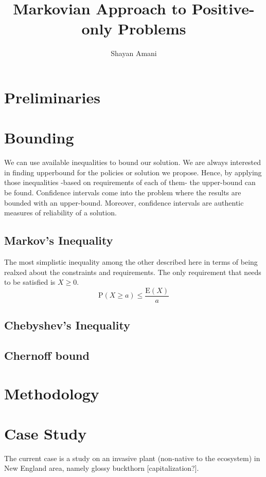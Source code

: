 \documentclass[a4paper,12pt]{article}
\title{Markovian Approach to Positive-only Problems}
\author{Shayan Amani}
\begin{document}
\maketitle

\section{Preliminaries}

\section{Bounding}
We can use available inequalities to bound our solution. We are always interested in finding upperbound for the policies or solution we propose. Hence, by applying those inequalities -based on requirements of each of them- the upper-bound can be found. Confidence intervals come into the problem where the results are bounded with an upper-bound. Moreover, confidence intervals are authentic measures of reliability of a solution.

    \subsection{Markov's Inequality}
The most simplistic inequality among the other described here in terms of being realxed about the constraints and requirements. The only requirement that needs to be satisfied is $X \geq 0$.
\begin{equation}
\mathrm {P}(X \geq a ) \leq \frac { \mathrm { E}( X ) } { a }
\end{equation}

    \subsection{Chebyshev's Inequality}
    \subsection{Chernoff bound}


\section{Methodology}


\section{Case Study}
The current case is a study on an invasive plant (non-native to the ecosystem) in New England area, namely glossy buckthorn [capitalization?].








\end{document}
